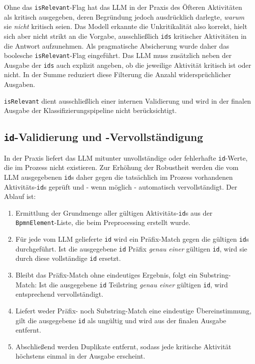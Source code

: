 Ohne das \texttt{isRelevant}-Flag hat das \ac{LLM} in der Praxis des Öfteren Aktivitäten als kritisch ausgegeben, deren Begründung jedoch ausdrücklich darlegte, \emph{warum} sie \emph{nicht} kritisch seien. Das Modell erkannte die Unkritikalität also korrekt, hielt sich aber nicht strikt an die Vorgabe, ausschließlich \texttt{ids} kritischer Aktivitäten in die Antwort aufzunehmen. Als pragmatische Absicherung wurde daher das boolesche \texttt{isRelevant}-Flag eingeführt. Das \ac{LLM} muss zusätzlich neben der Ausgabe der \texttt{ids} auch explizit angeben, ob die jeweilige Aktivität kritisch ist oder nicht. In der Summe reduziert diese Filterung die Anzahl widersprüchlicher Ausgaben.

\texttt{isRelevant} dient ausschließlich einer internen Validierung und wird in der finalen Ausgabe der Klassifizierungspipeline nicht berücksichtigt.

\subsection*{\texttt{id}-Validierung und -Vervollständigung}

In der Praxis liefert das \ac{LLM} mitunter unvollständige oder fehlerhafte \texttt{id}-Werte, die im Prozess nicht existieren. Zur Erhöhung der Robustheit werden die vom \ac{LLM} ausgegebenen \texttt{id}s daher gegen die tatsächlich im Prozess vorhandenen Aktivitäts-\texttt{id}s geprüft und - wenn möglich - automatisch vervollständigt. Der Ablauf ist:

\begin{enumerate}
    \item Ermittlung der Grundmenge aller gültigen Aktivitäts-\texttt{id}s aus der \texttt{BpmnElement}-Liste, die beim Preprocessing erstellt wurde.
    \item Für jede vom \ac{LLM} gelieferte \texttt{id} wird ein Präfix-Match gegen die gültigen \texttt{id}s durchgeführt. Ist die ausgegebene \texttt{id} Präfix \emph{genau einer} gültigen \texttt{id}, wird sie durch diese vollständige \texttt{id} ersetzt.
    \item Bleibt das Präfix-Match ohne eindeutiges Ergebnis, folgt ein Substring-Match: Ist die ausgegebene \texttt{id} Teilstring \emph{genau einer} gültigen \texttt{id}, wird entsprechend vervollständigt.
    \item Liefert weder Präfix- noch Substring-Match eine eindeutige Übereinstimmung, gilt die ausgegebene \texttt{id} als ungültig und wird aus der finalen Ausgabe entfernt.
    \item Abschließend werden Duplikate entfernt, sodass jede kritische Aktivität höchstens einmal in der Ausgabe erscheint.
\end{enumerate}

